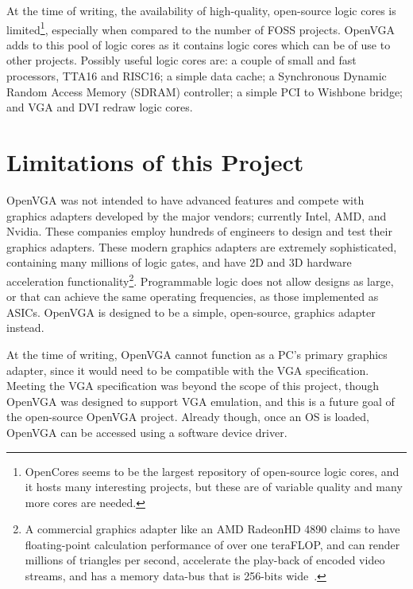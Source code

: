 At the time of writing, the availability of high-quality, open-source logic cores
is limited\footnote{OpenCores seems to be the largest repository of open-source
logic cores, and it hosts many interesting projects, but these are of variable
quality and many more cores are needed.}, especially when compared to the number
of FOSS projects. OpenVGA adds to this pool of logic cores as it contains logic
cores which can be of use to other projects. Possibly useful logic cores are: a
couple of small and fast processors, TTA16 and
RISC16; a simple data cache; a Synchronous
Dynamic Random Access Memory (SDRAM) controller; a simple PCI to Wishbone bridge; and VGA and
DVI redraw logic
cores.


\section{Limitations of this Project}
OpenVGA was not intended to have advanced features and compete with graphics
adapters developed by the major vendors; currently Intel, AMD, and Nvidia. These
companies employ hundreds of engineers to design and test their graphics
adapters. These modern graphics adapters are extremely sophisticated, containing
many millions of logic gates, and have 2D and 3D hardware acceleration
functionality\footnote{A commercial graphics adapter like an AMD
Radeon\texttrademark HD 4890 claims to have floating-point calculation
performance of over one teraFLOP, and can render millions of triangles per
second, accelerate the play-back of encoded video streams, and has a memory
data-bus that is 256-bits wide~\cite{AMD_4890}.}. Programmable logic does not
allow designs as large, or that can achieve the same operating frequencies, as
those implemented as ASICs. OpenVGA is designed to be a simple, open-source,
graphics adapter instead.

At the time of writing, OpenVGA cannot function as a PC's primary graphics
adapter, since it would need to be compatible with the VGA specification. Meeting
the VGA specification was beyond the scope of this project, though OpenVGA was
designed to support VGA emulation, and this is a future goal of the open-source
OpenVGA project. Already though, once an OS is loaded, OpenVGA can be accessed
using a software device driver.

